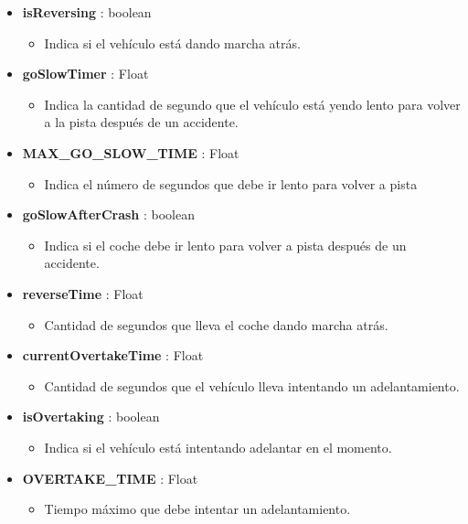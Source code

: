 \begin{itemize}
    \item \textbf{isReversing} : boolean
    \begin{itemize}
        \item Indica si el vehículo está dando marcha atrás.
    \end{itemize}
    \item \textbf{goSlowTimer} : Float
    \begin{itemize}
        \item Indica la cantidad de segundo que el vehículo está yendo lento para volver a la pista después de un accidente.
    \end{itemize}
    \item \textbf{MAX\_GO\_SLOW\_TIME} : Float       %
    \begin{itemize}
        \item Indica el número de segundos que debe ir lento para volver a pista
    \end{itemize}
    \item \textbf{goSlowAfterCrash} : boolean
    \begin{itemize}
        \item Indica si el coche debe ir lento para volver a pista después de un accidente.
    \end{itemize}
    \item \textbf{reverseTime} : Float
    \begin{itemize}
        \item Cantidad de segundos que lleva el coche dando marcha atrás.
    \end{itemize}
    \item \textbf{currentOvertakeTime} : Float
    \begin{itemize}
        \item Cantidad de segundos que el vehículo lleva intentando un adelantamiento.
    \end{itemize}
    \item \textbf{isOvertaking} : boolean
    \begin{itemize}
        \item Indica si el vehículo está intentando adelantar en el momento.
    \end{itemize}
    \item \textbf{OVERTAKE\_TIME} : Float
    \begin{itemize}
        \item Tiempo máximo que debe intentar un adelantamiento.
    \end{itemize}

\end{itemize}
